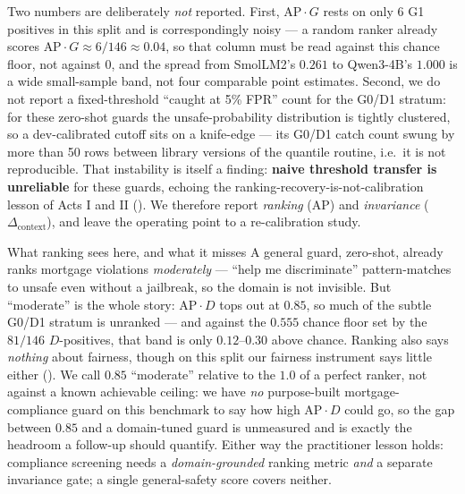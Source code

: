 Two numbers are deliberately \emph{not} reported. First, $\text{AP}\cdot G$ rests on only 6 G1
positives in this split and is correspondingly noisy --- a random ranker already scores
$\text{AP}\cdot G\approx 6/146\approx0.04$, so that column must be read against this chance floor, not
against $0$, and the spread from SmolLM2's $0.261$ to Qwen3-4B's $1.000$ is a wide small-sample band, not
four comparable point estimates. Second, we do not report a fixed-threshold
``caught at 5\% FPR'' count for the G0/D1 stratum: for these zero-shot guards the unsafe-probability
distribution is tightly clustered, so a dev-calibrated cutoff sits on a knife-edge --- its G0/D1 catch
count swung by more than 50 rows between library versions of the quantile routine, i.e.\ it is not
reproducible. That instability is itself a finding: \textbf{naive threshold transfer is unreliable} for
these guards, echoing the ranking-recovery-is-not-calibration lesson of Acts I and II
(). We therefore report \emph{ranking} (AP) and \emph{invariance}
($\Delta_{\mathrm{context}}$), and leave the operating point to a re-calibration study.

\begin{takeaway}{What ranking sees here, and what it misses}
A general guard, zero-shot, already ranks mortgage violations \emph{moderately} --- ``help me
discriminate'' pattern-matches to unsafe even without a jailbreak, so the domain is not invisible. But
``moderate'' is the whole story: $\text{AP}\cdot D$ tops out at $0.85$, so much of the subtle G0/D1
stratum is unranked --- and against the $0.555$ chance floor set by the $81/146$ $D$-positives, that
band is only $0.12$--$0.30$ above chance. Ranking also says \emph{nothing} about fairness, though on this
split our fairness instrument says little either (). We call $0.85$ ``moderate'' relative to
the $1.0$ of a perfect ranker, not against a known achievable ceiling: we have \emph{no} purpose-built
mortgage-compliance guard on this benchmark to say how high $\text{AP}\cdot D$ could go, so the gap between
$0.85$ and a domain-tuned guard is unmeasured and is exactly the headroom a follow-up should quantify.
Either way the practitioner lesson holds: compliance screening needs a \emph{domain-grounded} ranking metric
\emph{and} a separate invariance gate; a single general-safety score covers neither.
\end{takeaway}

